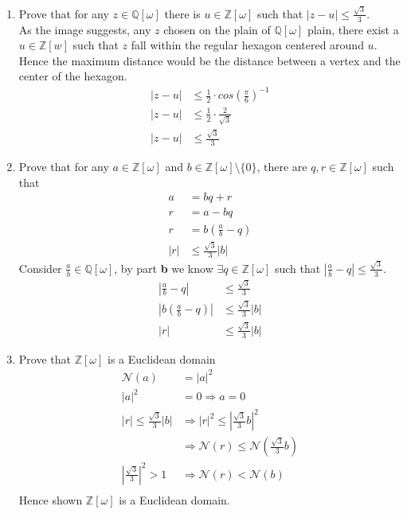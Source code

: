 \documentclass[12pt]{article}
\begin{document}
\begin{enumerate}
\begin{enumerate}
			\item Prove that for any $z \in \mathbb{Q}[\omega]$ there is $u \in
				\mathbb{Z}[\omega]$ such that $\mid z - u \mid \le
				\frac{\sqrt{3}}{3}$.\\
				As the image suggests, any $z$ chosen on the plain of
				$\mathbb{Q}[\omega]$ plain, there exist a $u \in \mathbb{Z}[w]$ such
				that $z$ fall within the regular hexagon centered around $u$. Hence the
				maximum distance would be the distance between a vertex and the center
				of the hexagon.
				\begin{align*}
					|z-u| &\le \frac{1}{2} \cdot cos\left(\frac{\pi}{6}\right)^{-1}\\
					|z-u| &\le \frac{1}{2} \cdot \frac{2}{\sqrt{3}}\\
					|z-u| &\le \frac{\sqrt{3}}{3}
				\end{align*}

			\item Prove that for any $a \in \mathbb{Z}[\omega]$ and $b \in
				\mathbb{Z}[\omega] \setminus \{0\}$, there are $q, r \in
				\mathbb{Z}[\omega]$ such that 
				\begin{align*}
					a &= bq + r\\
					r &= a - bq\\
					r &= b(\frac{a}{b} - q)\\
					|r| &\leq \frac{\sqrt{3}}{3} |b|
				\end{align*}
				Consider $\frac{a}{b} \in \mathbb{Q}[\omega]$, by part \textbf{b} we
				know $\exists q \in \mathbb{Z}[\omega]$ such that $|\frac{a}{b} - q| \le
				\frac{\sqrt{3}}{3}$.
				\begin{align*}
				\left|\frac{a}{b} - q\right| &\le \frac{\sqrt{3}}{3}\\
				\left|b\left(\frac{a}{b} - q\right)\right| &\le \frac{\sqrt{3}}{3}|b|\\
				|r| &\le \frac{\sqrt{3}}{3}|b|
				\end{align*}
				
			\item Prove that $\mathbb{Z}[\omega]$ is a Euclidean domain
				\begin{align*}
					\mathcal{N}(a) &= |a|^2\\
					|a|^2 &= 0 \Rightarrow a=0\\
					|r| \le \frac{\sqrt{3}}{3}|b| &\Rightarrow |r|^2 \le
					\left|\frac{\sqrt{3}}{3}b\right|^2\\
					&\Rightarrow \mathcal{N}(r) \le
					\mathcal{N}\left(\frac{\sqrt{3}}{3}b\right)\\
					\left|\frac{\sqrt{3}}{3}\right|^2 > 1 &\Rightarrow \mathcal{N}(r) <
					\mathcal{N}(b)\\
				\end{align*}
				Hence shown $\mathbb{Z}[\omega]$ is a Euclidean domain.
			

\end{enumerate}
\end{enumerate}
\end{document}
